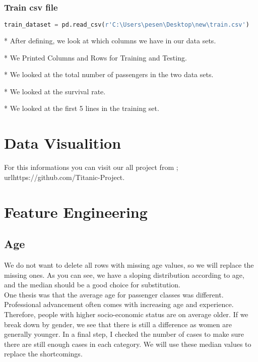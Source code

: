 \documentclass[onecolumn]{article}
\begin{document}
\subsubsection{Train csv file} 
 
\begin{lstlisting}[language=Python, caption= train] 
train_dataset = pd.read_csv(r'C:\Users\pesen\Desktop\new\train.csv')   #for Fatma (r'C:\Users\Fatma\Desktop\new\train.csv')
\end{lstlisting}
 
 * After defining, we look at which columns we have in our data sets.
 
* We Printed Columns and Rows for Training and Testing.

* We looked at the total number of passengers in the two data sets.

* We looked at the survival rate.

* We looked at the first 5 lines in the training set.
\section{Data Visualition}

For this informations you can visit our all project from ;\\
url{https://github.com/Titanic-Project.}

\section{Feature Engineering}

\subsection{Age}

We do not want to delete all rows with missing age values, so we will replace the missing ones. As you can see, we have a sloping distribution according to age, and the median should be a good choice for substitution.\\

One thesis was that the average age for passenger classes was different. Professional advancement often comes with increasing age and experience. Therefore, people with higher socio-economic status are on average older. If we break down by gender, we see that there is still a difference as women are generally younger. In a final step, I checked the number of cases to make sure there are still enough cases in each category. We will use these median values to replace the shortcomings.
\end{document}
